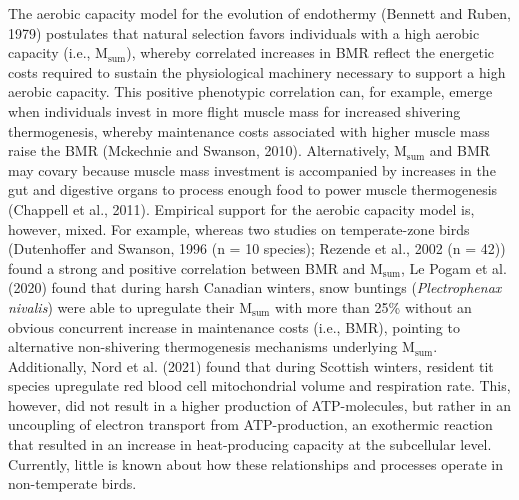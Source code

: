 \documentclass[10pt, twoside]{book} %
\begin{document}
The aerobic capacity model for the evolution of endothermy (Bennett and Ruben, 1979) postulates that natural selection favors individuals with a high aerobic capacity (i.e., M$_{\text{sum}}$), whereby correlated increases in BMR reflect the energetic costs required to sustain the physiological machinery necessary to support a high aerobic capacity. This positive phenotypic correlation can, for example, emerge when individuals invest in more flight muscle mass for increased shivering thermogenesis, whereby maintenance costs associated with higher muscle mass raise the BMR (Mckechnie and Swanson, 2010). Alternatively, M$_{\text{sum}}$ and BMR may covary because muscle mass investment is accompanied by increases in the gut and digestive organs to process enough food to power muscle thermogenesis (Chappell et al., 2011). Empirical support for the aerobic capacity model is, however, mixed. For example, whereas two studies on temperate-zone birds (Dutenhoffer and Swanson, 1996 (n = 10 species); Rezende et al., 2002 (n = 42)) found a strong and positive correlation between BMR and M$_{\text{sum}}$, Le Pogam et al. (2020) found that during harsh Canadian winters, snow buntings (\textit{Plectrophenax nivalis}) were able to upregulate their M$_{\text{sum}}$ with more than 25\% without an obvious concurrent increase in maintenance costs (i.e., BMR), pointing to alternative non-shivering thermogenesis mechanisms underlying M$_{\text{sum}}$. Additionally, Nord et al. (2021) found that during Scottish winters, resident tit species upregulate red blood cell mitochondrial volume and respiration rate. This, however, did not result in a higher production of ATP-molecules, but rather in an uncoupling of electron transport from ATP-production, an exothermic reaction that resulted in an increase in heat-producing capacity at the subcellular level. Currently, little is known about how these relationships and processes operate in non-temperate birds.\\
\end{document}
